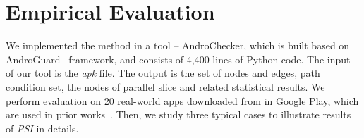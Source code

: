 \section{Empirical Evaluation}
We implemented the method in a tool -- AndroChecker, which is built based on AndroGuard~\cite{new2013androguard} framework, and consists of 4,400 lines of Python code. The input of our tool is the \textit{apk} file. The output is the set of nodes and edges, path condition set, the nodes of parallel slice and related statistical results.
We perform evaluation on 20 real-world apps downloaded from in Google Play, which are used in prior works~\cite{new2015static, new2015window}. %
Then, we study three typical cases to illustrate results of \textit{PSI} in details. 

